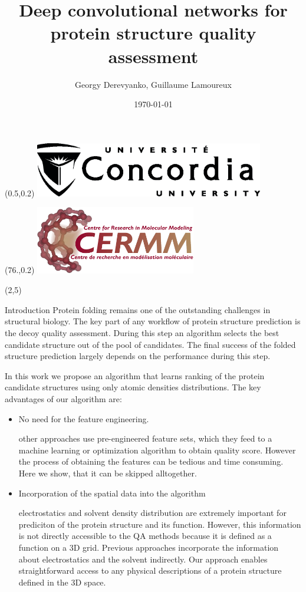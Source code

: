 \documentclass[final, unknownkeysallowed]{beamer}
\title{Deep convolutional networks for protein structure quality assessment}
\author{Georgy Derevyanko, Guillaume Lamoureux}
\institute[CLS]{Concordia University, QC, Canada}
\date{\today}
\begin{document}
\begin{frame}{}

\begin{textblock}{6}(0.5,0.2)
\includegraphics[width=10.0cm]{Logo/ConULogo_K}
\end{textblock}
\begin{textblock}{6}(76.,0.2)
\includegraphics[width=7.0cm]{Logo/CERMM_transparent.png}
\end{textblock}



\begin{textblock}{39.0}(2,5)
\begin{block}{Introduction}
Protein folding remains one of the outstanding challenges in structural biology. 
The key part of any workflow of protein structure prediction is the decoy quality assessment. 
During this step an algorithm selects the best candidate structure out of the pool of candidates. The final 
success of the folded structure prediction largely depends on the performance during this step.

In this work we propose an algorithm that learns ranking of the protein candidate structures using 
only atomic densities distributions. The key advantages of our algorithm are:
\begin{itemize}
\item No need for the feature engineering.

other approaches use pre-engineered feature sets, which they feed to a machine learning or optimization 
algorithm to obtain quality score. However the process of obtaining the features can be tedious and time 
consuming. Here we show, that it can be skipped alltogether.

\item Incorporation of the spatial data into the algorithm

electrostatics and solvent density distribution are extremely important for prediciton of the protein 
structure and its function. However, this information is not directly accessible to the QA methods 
because it is defined as a function on a 3D grid. Previous approaches incorporate the information 
about electrostatics and the solvent indirectly. Our approach enables straightforward access to any 
physical descriptions of a protein structure defined in the 3D space.
\end{itemize}
\end{block}


\end{textblock}
\end{frame}
\end{document}
